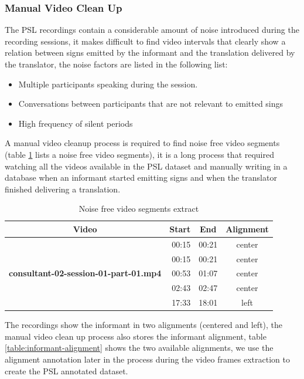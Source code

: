 \documentclass[twocolumn,conference]{article}
\begin{document}
\subsubsection{Manual Video Clean Up}\label{manual-video-cleanup}
The PSL recordings contain a considerable amount of noise introduced during the recording sessions, it makes difficult to find video intervals that clearly show a relation between signs emitted by the informant and the translation delivered by the translator, the noise factors are listed in the following list:
\begin{itemize}
	\item Multiple participants speaking during the session.
	\item Conversations between participants that are not relevant to emitted sings
	\item High frequency of silent periods 
\end{itemize}
A manual video cleanup process is required to find noise free video segments (table \ref{table:noise-free-video-segments} lists a noise free video segments), it is a long process that required watching all the videos available in the PSL dataset and manually writing in a database when an informant started emitting signs and when the translator finished delivering a translation.
\begin{table}[!htb]
\captionsetup{font=footnotesize}
\centering
\begin{tabular}{lrrc}
\toprule
\multicolumn{1}{c}{\textbf{Video}} & 
	\multicolumn{1}{c}{\textbf{Start}} &
	\multicolumn{1}{c}{\textbf{End}} &
	\multicolumn{1}{c}{\textbf{Alignment}}\\
\midrule
\multirow{5}{7.5em}{\textbf{consultant-02-session-01-part-01.mp4}} & 00:15 & 00:21 & center\\
& 00:15 & 00:21 & center\\
& 00:53 & 01:07 & center\\
& 02:43 & 02:47 & center\\
& 17:33 & 18:01 & left\\
\bottomrule
\end{tabular}
\captionsetup{font=footnotesize}
\caption{Noise free video segments extract} \label{table:noise-free-video-segments}
\end{table}
The recordings show the informant in two alignments (centered and left), the manual video clean up process also stores the informant alignment, table \ref{table:informant-alignment} shows the two available alignments, we use the alignment annotation later in the process during the video frames extraction to create the PSL annotated dataset.
\end{document}
